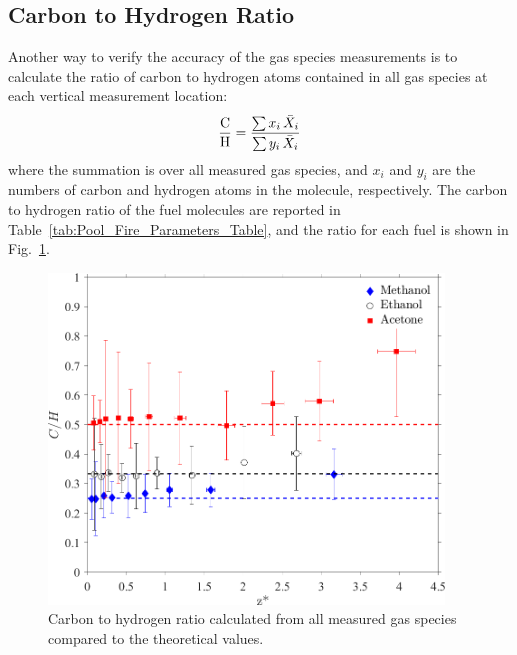 \documentclass[12pt]{article}
\begin{document}
\subsection{Carbon to Hydrogen Ratio}

Another way to verify the accuracy of the gas species measurements is to calculate the ratio of carbon to hydrogen atoms contained in all gas species at each vertical measurement location:
\begin{equation}\label{eq:c2h_ratio}
  \frac{\rm C}{\rm H}=\frac{ \sum  x_i \, \bar{X}_{i} }{ \sum y_i \, \bar{X}_{i} }
\end{equation}
where the summation is over all measured gas species, and $x_i$ and $y_i$ are the numbers of carbon and hydrogen atoms in the molecule, respectively. The carbon to hydrogen ratio of the fuel molecules are reported in Table~\ref{tab:Pool_Fire_Parameters_Table}, and the ratio for each fuel is shown in Fig.~\ref{fig:C2H}. 

\begin{figure}[h!]
	\centering
\includegraphics[width=10.5cm, keepaspectratio]{C2H_ratio_Comparison.png}
	\caption[Carbon to hydrogen ratio calculated from all species]{Carbon to hydrogen ratio calculated from all measured gas species compared to the theoretical values.}
	\label{fig:C2H}
\end{figure}
\end{document}
